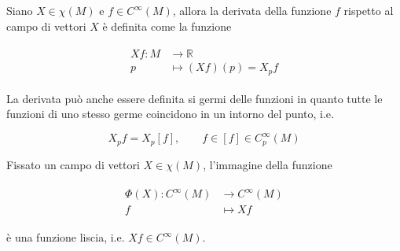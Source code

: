 Siano $ X \in \chi(M) $ e $ f \in C^{\infty}(M) $, allora la derivata della funzione $ f $ rispetto al campo di vettori $ X $ è definita come la funzione

\begin{align}
	\begin{split}
		X f : M &\to \mathbb{R}\\
		p &\mapsto (X f)(p) = X_{p} f
	\end{split}
\end{align}

La derivata può anche essere definita si germi delle funzioni in quanto tutte le funzioni di uno stesso germe coincidono in un intorno del punto, i.e.

\begin{equation}
	X_{p} f = X_{p} [f], \qquad f \in [f] \in C_{p}^{\infty}(M)
\end{equation}

\begin{definition}
	Fissato un campo di vettori $ X \in \chi(M) $, l'immagine della funzione
	
	\begin{align}
		\begin{split}
			\Phi(X) : C^{\infty}(M) &\to C^{\infty}(M)\\
			f &\mapsto X f
		\end{split}
	\end{align}

	è una funzione liscia, i.e. $ X f \in C^{\infty}(M) $.
\end{definition}


